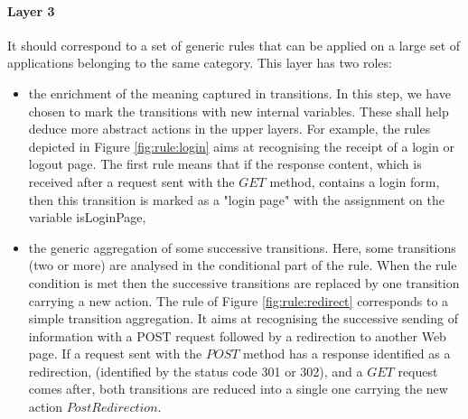 \paragraph{Layer 3}
It should correspond to a set of generic rules that can be
applied on a large set of applications belonging to the same
category. This layer has two roles:

\begin{itemize}
\item the enrichment of the meaning captured in transitions. In
this step, we have chosen to mark the transitions with new
internal variables. These shall help deduce more abstract actions
in the upper layers. For example, the rules depicted in Figure
\ref{fig:rule:login} aims at recognising the receipt of a login
or logout page. The first rule means that if the response
content, which is received after a request sent with the $GET$
method,  contains a login form, then this transition is marked as
a "login page" with the assignment on the variable isLoginPage,

\item the generic aggregation of some successive transitions.
Here, some transitions (two or more) are analysed in the
conditional part of the rule. When the rule condition is met then
the successive transitions are replaced by one transition
carrying a new action. The rule of Figure \ref{fig:rule:redirect}
corresponds to a simple transition aggregation. It aims at
recognising the successive sending of information with a POST
request followed by a redirection to another Web page.  If a
request sent with the $POST$ method has a response identified as
a redirection, (identified by the status code 301 or 302), and  a
$GET$ request comes after, both transitions are reduced into a
single one carrying the new action $PostRedirection$.

\end{itemize}

